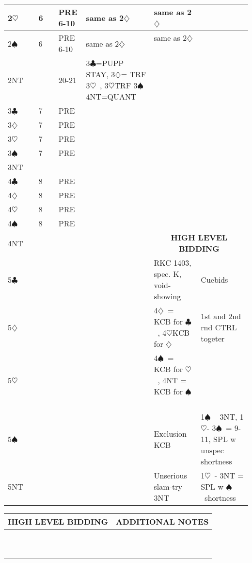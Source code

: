\documentclass{article}
\newcommand\C{\ensuremath{\clubsuit}}
\newcommand\D{\ensuremath{\diamondsuit}}
\renewcommand\H{\ensuremath{\heartsuit}}
\renewcommand\S{\ensuremath{\spadesuit}}
\newcommand\N{{\footnotesize NT}}
\begin{document}
\begin{tabular}{| p{9mm} | p{9mm} | p{9mm} | p{9mm} | p{30mm} | p{80mm} | p{62mm} | p{50mm} |}
	2\H & &6 & &PRE 6-10 &same as 2\D\ &same as 2\D\ & \\ \hline
	2\S & &6 & &PRE 6-10 &same as 2\D\ &same as 2\D\ & \\ \hline
	2\N & & & &20-21 & 3\C =PUPP STAY, 3\D= TRF 3\H\ , 3\H\= TRF 3\S\, 4NT=QUANT & & \\ \hline
	3\C & &7 & &PRE & & & \\ \hline
	3\D & &7 & &PRE & & & \\ \hline
	3\H & &7 & &PRE & & & \\ \hline
	3\S & &7 & &PRE & & & \\ \hline
	3\N & & & & & & & \\ \hline
	4\C & &8 & &PRE & & & \\ \hline
	4\D & &8 & &PRE & & & \\ \hline
	4\H & &8 & &PRE & & & \\ \hline
	4\S & &8 & &PRE & & & \\ \hline
        4\N & & & & & &\multicolumn{2}{c}{\cellcolor[gray]{0.9} \textbf{HIGH LEVEL BIDDING}} \\ \hline
	5\C & & & & & &RKC 1403, spec. K, void-showing    & Cuebids\\ \hline
	5\D & & & & & & 4\D\ = KCB for \C\ , 4\H\= KCB for \D\  & 1st and 2nd rnd CTRL togeter \\ \hline
	5\H & & & & & &4\S\ = KCB for \H\ , 4NT = KCB for \S\  & \\ \hline
	5\S & & & & & &Exclusion KCB  & 1\S\ - 3NT, 1\H - 3\S\  = 9-11, SPL w unspec shortness \\ \hline
	5\N & & & & & &Unserious slam-try 3NT & 1\H\ - 3NT = SPL w \S\ shortness\\ \hline
\end{tabular}

\noindent
\begin{tabular}{| p{139.1mm} | p{139.1mm} |}
	\cellcolor[gray]{0.9} \textbf{HIGH LEVEL BIDDING} & \cellcolor[gray]{0.9} \textbf{ADDITIONAL NOTES} \\ \hline
	& \\ \hline
	& \\ \hline
	& \\ \hline
	& \\ \hline
	& \\ \hline
	& \\ \hline
	& \\ \hline
	& \\ \hline
	& \\ \hline
	& \\ \hline
\end{tabular}
\end{document}
